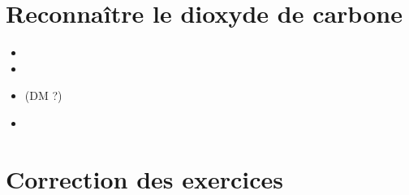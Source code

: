 \documentclass[12pt,a4paper]{article}
\begin{document}
\section{Reconnaître le dioxyde de carbone}





\begin{myexos}
	\begin{multicols}{2}
		
		\begin{itemize}
			\item {}
			\item {}
			\item {} (DM ?)
			\item {}
		\end{itemize}
		
	\end{multicols}
\end{myexos}

\appendix

\newpage

\section*{Correction des exercices}


\end{document}

